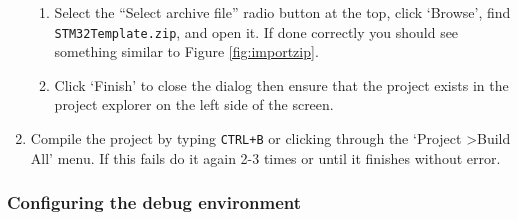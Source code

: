\documentclass{UoNMCHA}
\numberwithin{equation}{section}
\begin{document}
\begin{enumerate}
\begin{enumerate}
        \item Select the ``Select archive file'' radio button at the top, click `Browse', find \texttt{STM32Template.zip}, and open it. If done correctly you should see something similar to Figure \ref{fig:importzip}.
    
        \item Click `Finish' to close the dialog then ensure that the project exists in the project explorer on the left side of the screen.
    \end{enumerate}
    
    \item Compile the project by typing \texttt{CTRL+B} or clicking through the `Project \textgreater Build All' menu. If this fails do it again 2-3 times or until it finishes without error.
\end{enumerate}

\pagebreak

\subsubsection{Configuring the debug environment}
\end{document}
